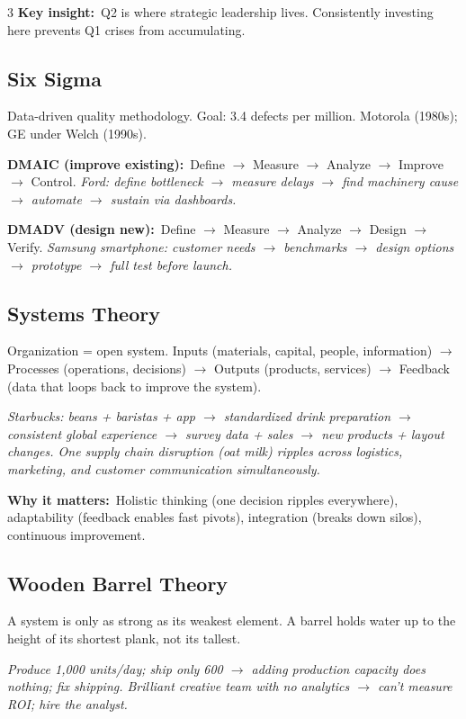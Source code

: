 \documentclass[7.6pt,letterpaper]{article}
\newcommand{\T}[1]{\textbf{\color{navy}#1}}
\newcommand{\kk}[2]{\noindent\T{#1}\ #2\par}
\newcommand{\eg}[1]{\textit{\color{mid}#1}}
\begin{document}
\begin{multicols}{3}
\kk{Key insight:}{Q2 is where strategic leadership lives. Consistently investing here prevents Q1 crises from accumulating.}

\subsection{Six Sigma}

Data-driven quality methodology. Goal: 3.4 defects per million. Motorola (1980s); GE under Welch (1990s).

\kk{DMAIC (improve existing):}{Define $\to$ Measure $\to$ Analyze $\to$ Improve $\to$ Control. \eg{Ford: define bottleneck $\to$ measure delays $\to$ find machinery cause $\to$ automate $\to$ sustain via dashboards.}}
\kk{DMADV (design new):}{Define $\to$ Measure $\to$ Analyze $\to$ Design $\to$ Verify. \eg{Samsung smartphone: customer needs $\to$ benchmarks $\to$ design options $\to$ prototype $\to$ full test before launch.}}

\subsection{Systems Theory}

Organization = open system. Inputs (materials, capital, people, information) $\to$ Processes (operations, decisions) $\to$ Outputs (products, services) $\to$ Feedback (data that loops back to improve the system).

\eg{Starbucks: beans + baristas + app $\to$ standardized drink preparation $\to$ consistent global experience $\to$ survey data + sales $\to$ new products + layout changes. One supply chain disruption (oat milk) ripples across logistics, marketing, and customer communication simultaneously.}

\kk{Why it matters:}{Holistic thinking (one decision ripples everywhere), adaptability (feedback enables fast pivots), integration (breaks down silos), continuous improvement.}

\subsection{Wooden Barrel Theory}

A system is only as strong as its weakest element. A barrel holds water up to the height of its shortest plank, not its tallest.

\eg{Produce 1,000 units/day; ship only 600 $\to$ adding production capacity does nothing; fix shipping. Brilliant creative team with no analytics $\to$ can't measure ROI; hire the analyst.}


\end{multicols}
\end{document}
